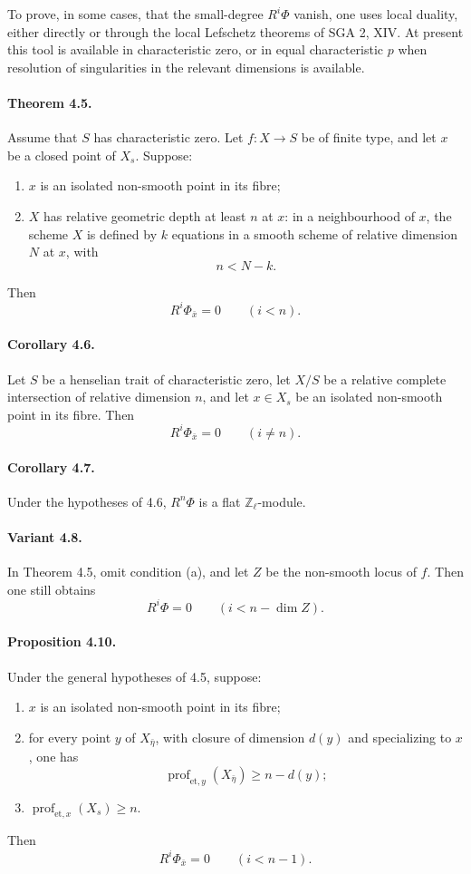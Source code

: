 \documentclass[12pt]{article}
\newcommand{\ZZ}{\mathbb Z}
\newcommand{\prof}{\operatorname{prof}}
\begin{document}
To prove, in some cases, that the small-degree $R^i\Phi$ vanish, one uses local duality, either directly or through the local Lefschetz theorems of SGA 2, XIV. At present this tool is available in characteristic zero, or in equal characteristic $p$ when resolution of singularities in the relevant dimensions is available.

\paragraph{Theorem 4.5.}
Assume that $S$ has characteristic zero. Let $f:X\to S$ be of finite type, and let $x$ be a closed point of $X_s$. Suppose:
\begin{enumerate}[label=(\alph*)]
\item $x$ is an isolated non-smooth point in its fibre;
\item $X$ has relative geometric depth at least $n$ at $x$: in a neighbourhood of $x$, the scheme $X$ is defined by $k$ equations in a smooth scheme of relative dimension $N$ at $x$, with
\[
n<N-k.
\]
\end{enumerate}
Then
\[
R^i\Phi_{\bar x}=0\qquad (i<n).
\]

\paragraph{Corollary 4.6.}
Let $S$ be a henselian trait of characteristic zero, let $X/S$ be a relative complete intersection of relative dimension $n$, and let $x\in X_s$ be an isolated non-smooth point in its fibre. Then
\[
R^i\Phi_{\bar x}=0\qquad (i\neq n).
\]

\paragraph{Corollary 4.7.}
Under the hypotheses of 4.6, $R^n\Phi$ is a flat $\ZZ_\ell$-module.

\paragraph{Variant 4.8.}
In Theorem 4.5, omit condition (a), and let $Z$ be the non-smooth locus of $f$. Then one still obtains
\[
R^i\Phi=0\qquad (i<n-\dim Z).
\]

\paragraph{Proposition 4.10.}
Under the general hypotheses of 4.5, suppose:
\begin{enumerate}[label=(\alph*)]
\item $x$ is an isolated non-smooth point in its fibre;
\item for every point $y$ of $X_{\bar\eta}$, with closure of dimension $d(y)$ and specializing to $x$, one has
\[
\prof_{\mathrm{et},y}(X_{\bar\eta})\geq n-d(y);
\]
\item $\prof_{\mathrm{et},x}(X_s)\geq n$.
\end{enumerate}
Then
\[
R^i\Phi_{\bar x}=0\qquad (i<n-1).
\]
\end{document}
